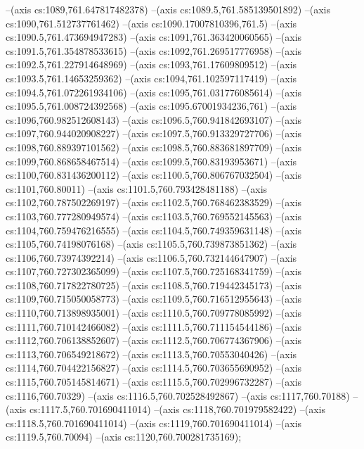 --(axis cs:1089,761.647817482378)
--(axis cs:1089.5,761.585139501892)
--(axis cs:1090,761.512737761462)
--(axis cs:1090.17007810396,761.5)
--(axis cs:1090.5,761.473694947283)
--(axis cs:1091,761.363420060565)
--(axis cs:1091.5,761.354878533615)
--(axis cs:1092,761.269517776958)
--(axis cs:1092.5,761.227914648969)
--(axis cs:1093,761.17609809512)
--(axis cs:1093.5,761.14653259362)
--(axis cs:1094,761.102597117419)
--(axis cs:1094.5,761.072261934106)
--(axis cs:1095,761.031776085614)
--(axis cs:1095.5,761.008724392568)
--(axis cs:1095.67001934236,761)
--(axis cs:1096,760.982512608143)
--(axis cs:1096.5,760.941842693107)
--(axis cs:1097,760.944020908227)
--(axis cs:1097.5,760.913329727706)
--(axis cs:1098,760.889397101562)
--(axis cs:1098.5,760.883681897709)
--(axis cs:1099,760.868658467514)
--(axis cs:1099.5,760.83193953671)
--(axis cs:1100,760.831436200112)
--(axis cs:1100.5,760.806767032504)
--(axis cs:1101,760.80011)
--(axis cs:1101.5,760.793428481188)
--(axis cs:1102,760.787502269197)
--(axis cs:1102.5,760.768462383529)
--(axis cs:1103,760.777280949574)
--(axis cs:1103.5,760.769552145563)
--(axis cs:1104,760.759476216555)
--(axis cs:1104.5,760.749359631148)
--(axis cs:1105,760.74198076168)
--(axis cs:1105.5,760.739873851362)
--(axis cs:1106,760.73974392214)
--(axis cs:1106.5,760.732144647907)
--(axis cs:1107,760.727302365099)
--(axis cs:1107.5,760.725168341759)
--(axis cs:1108,760.717822780725)
--(axis cs:1108.5,760.719442345173)
--(axis cs:1109,760.715050058773)
--(axis cs:1109.5,760.716512955643)
--(axis cs:1110,760.713898935001)
--(axis cs:1110.5,760.709778085992)
--(axis cs:1111,760.710142466082)
--(axis cs:1111.5,760.711154544186)
--(axis cs:1112,760.706138852607)
--(axis cs:1112.5,760.706774367906)
--(axis cs:1113,760.706549218672)
--(axis cs:1113.5,760.70553040426)
--(axis cs:1114,760.704422156827)
--(axis cs:1114.5,760.703655690952)
--(axis cs:1115,760.705145814671)
--(axis cs:1115.5,760.702996732287)
--(axis cs:1116,760.70329)
--(axis cs:1116.5,760.702528492867)
--(axis cs:1117,760.70188)
--(axis cs:1117.5,760.701690411014)
--(axis cs:1118,760.701979582422)
--(axis cs:1118.5,760.701690411014)
--(axis cs:1119,760.701690411014)
--(axis cs:1119.5,760.70094)
--(axis cs:1120,760.700281735169);
